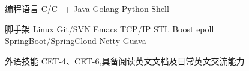 

\begin{cvskills}

  \cvskill
    {编程语言} %
    {C/C++ \textbullet{} Java \textbullet{} Golang \textbullet{} Python \textbullet{} Shell} %

  \cvskill
    {脚手架} %
    {Linux \textbullet{} Git/SVN \textbullet{} Emacs \textbullet{} TCP/IP
      \textbullet{} STL \textbullet{} Boost \textbullet{} epoll \textbullet{}
      SpringBoot/SpringCloud \textbullet{} Netty \textbullet{} Guava } %


  \cvskill
    {外语技能} %
    {CET-4、CET-6,具备阅读英文文档及日常英文交流能力} %

\end{cvskills}
